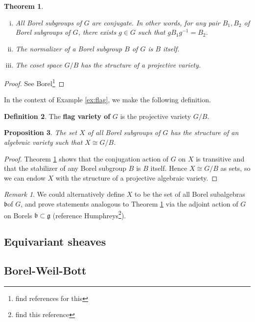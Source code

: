 \documentclass{article}
\newcommand{\fr}{\mathfrak}
\theoremstyle{plain}
\newtheorem{theorem}{Theorem}[section]
\newtheorem{proposition}[theorem]{Proposition}
\theoremstyle{definition}
\newtheorem{definition}[theorem]{Definition}
\theoremstyle{remark}
\newtheorem*{remark}{Remark}
\DeclareMathOperator{\Gr}{Gr}
\begin{document}
\begin{theorem}\hspace{1mm}
    \begin{enumerate}[(i)]
        \item All Borel subgroups of $G$ are conjugate. In other words, for any pair
            $B_1,B_2$ of Borel subgroups of $G$, there exists $g\in G$ such that
            $gB_1g^{-1}=B_2$.
        \item The normalizer of a Borel subgroup $B$ of $G$ is $B$ itself.
        \item The coset space $G/B$ has the structure of a projective variety.
    \end{enumerate}
    \label{thm:borel}
\end{theorem}
\begin{proof}
    See Borel\footnote{find references for this}
\end{proof}

In the context of Example \ref{ex:flag}, we make the following definition.
\begin{definition}
    The \textbf{flag variety of} $G$ is the projective variety $G/B$.
\end{definition}

\begin{proposition}
    The set $X$ of all Borel subgroups of $G$ has the structure of an algebraic
    variety such that $X\cong G/B$.
\end{proposition}
\begin{proof}
    Theorem \ref{thm:borel} shows that the conjugation action of $G$ on $X$ is transitive
    and that the stabilizer of any Borel subgroup $B$ is $B$ itself. Hence $X\cong G/B$ as
    sets, so we can endow $X$ with the structure of a projective algebraic variety.
\end{proof}

\begin{remark}
    We could alternatively define $X$ to be the set of all Borel subalgebras $\fr b$of $G$,
    and prove statements analogous to
    Theorem \ref{thm:borel}
    via the adjoint action of $G$ on Borels $\fr b\subset\fr g$ (reference Humphreys\footnote{find this reference}).
\end{remark}

\subsection{Equivariant sheaves}
\subsection{Borel-Weil-Bott}

\end{document}
